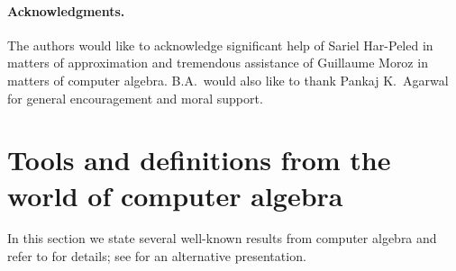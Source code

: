 \documentclass[11pt]{article}
\theoremstyle{remark}
\newcommand{\old}[1]{{{}}}
\def\L{\mathcal{L}}
\def\Q{\mathcal{Q}}
\def\S{\mathcal{S}}
\begin{document}
\paragraph*{Acknowledgments.}
The authors would like to acknowledge significant help of Sariel Har-Peled in matters of approximation and tremendous assistance of Guillaume Moroz in matters of computer algebra.  B.A.\ would also like to thank Pankaj K.\ Agarwal for general encouragement and moral support.

\old{
\section{Other problems that we discussed}

\begin{enumerate}
\item
If we can do batched point location in the plane, then we may be able to improve the running time of the known algorithms for the maximum capacity problem, which is defined as follows.
Let $\L = \{(c_1, s_1), \ldots, (c_n, s_n)\}$ be a set of $n$ pairs of points in the
plane representing $n$ (directional) links. In a link $(c_i, s_i) \in \L$, the point $c_i$
represents the receiver and the point $s_i$ represents the sender.
The goal is to find a maximum cardinality subset
of links that can operate simultaneously in the SINR model.

\item
Can we say something on the following problem which we call
{\em maximum capacity with acknowledgment} and that seems to be new.
Find a maximum subset $\L' \subseteq \L$ of links that can operate simultaneously as follows.
In the first part of a round
all senders in $\L'$ send their messages simultaneously to their corresponding receivers, and in the second part
all receivers in $\L'$ acknowledge receipt of their messages simultaneously.

\item
We also tried to come up with some interesting problem, where we are given a set of transmitters $\S$ and a set of receivers $\Q$, but not the transmitter-to-receiver matching.
   
\end{enumerate}
}

\newpage



\newpage
\appendix 

\section{Tools and definitions from the world of computer algebra}
In this section we state several well-known results from computer algebra and refer to \cite{gg-mca-99} for details; see \cite{bp-pmcfa-94} for an alternative presentation.  
\end{document}
